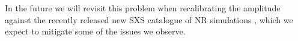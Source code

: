 \documentclass[twocolumn,prd,aps,superscriptaddress,preprintnumbers,tightenlines,showpacs,nofootinbib,eqsecnum,amsfonts,amsmath]{revtex4}
\begin{document}
In the future we will revisit this problem when recalibrating the amplitude against the recently released new SXS catalogue of NR simulations \cite{Boyle:2019kee}, which we expect to mitigate some of the issues we observe.


\end{document}
